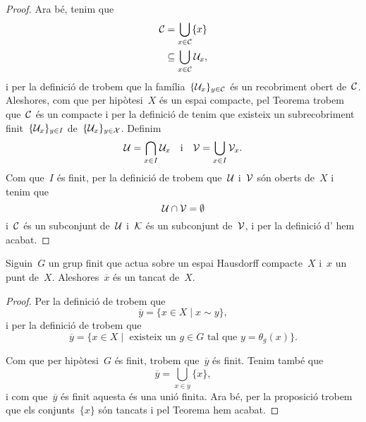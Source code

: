 \documentclass[../../main.tex]{subfiles}
\begin{document}
\begin{theorem}
\begin{proof}
            Ara bé, tenim que
            \begin{align*}
                \mathcal{C}&=\bigcup_{x\in\mathcal{C}}\{x\} \\
                &\subseteq\bigcup_{x\in\mathcal{C}}\mathcal{U}_{x},
            \end{align*}
            i per la definició de  trobem que la família~\(\{\mathcal{U}_{x}\}_{y\in\mathcal{C}}\) és un recobriment obert de~\(\mathcal{C}\).
            Aleshores, com que per hipòtesi~\(X\) és un espai compacte, pel Teorema  trobem que~\(\mathcal{C}\) és un compacte i per la definició de  tenim que existeix un subrecobriment finit~\(\{\mathcal{U}_{x}\}_{y\in I}\) de~\(\{\mathcal{U}_{x}\}_{y\in\mathcal{X}}\).
            Definim
            \[
                \mathcal{U}=\bigcap_{x\in I}\mathcal{U}_{x}\quad\text{i}\quad\mathcal{V}=\bigcup_{x\in I}\mathcal{V}_{x}.
            \]
            Com que~\(I\) és finit, per la definició de  trobem que~\(\mathcal{U}\) i~\(\mathcal{V}\) són oberts de~\(X\) i tenim que
            \[
                \mathcal{U}\cap\mathcal{V}=\emptyset
            \]
            i~\(\mathcal{C}\) és un subconjunt de~\(\mathcal{U}\) i~\(\mathcal{K}\) és un subconjunt de~\(\mathcal{V}\), i per la definició d' hem acabat.
        \end{proof}
    \end{theorem}
    \begin{lemma}
        \label{lema:els elements del quocient d'un Hausdorff compacte per un grup finit són tancats en l'espai original}
        Siguin~\(G\) un grup finit que actua sobre un espai Hausdorff compacte~\(X\) i~\(x\) un punt de~\(X\).
        Aleshores~\(\overline{x}\) és un tancat de~\(X\).
        \begin{proof}
            Per la definició de  trobem que
            \[
                \overline{y}=\{x\in X\mid x\sim y\},
            \]
            i per la definició de  trobem que
            \[
                \overline{y}=\{x\in X\mid\text{ existeix un }g\in G\text{ tal que }y=\theta_{g}(x)\}.
            \]

            Com que per hipòtesi~\(G\) és finit, trobem que~\(\overline{y}\) és finit.
            Tenim també que
            \[
                \overline{y}=\bigcup_{x\in\overline{y}}\{x\},
            \]
            i com que~\(\overline{y}\) és finit aquesta és una unió finita.
            Ara bé, per la proposició  trobem que els conjunts~\(\{x\}\) són tancats i pel Teorema  hem acabat.
        \end{proof}
    \end{lemma}
\end{document}
